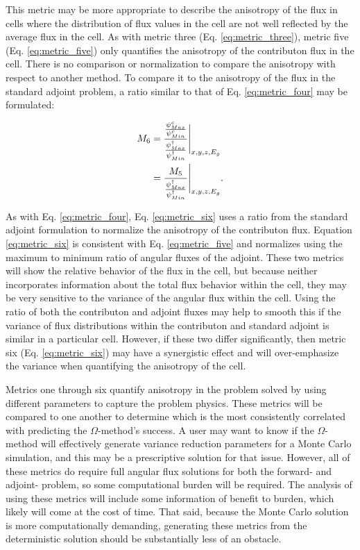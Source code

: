 This metric may be more appropriate to describe the anisotropy of the flux in
cells where the distribution of flux values in the cell are not well
reflected by the average flux in the cell. As with metric three (Eq.
\eqref{eq:metric_three}), metric five (Eq. \eqref{eq:metric_five}) only quantifies
the anisotropy of the contributon flux in the cell. There is no comparison or
normalization to compare the anisotropy with respect to another method. To
compare it to the anisotropy of the flux in the standard adjoint
problem, a ratio similar to that of Eq. \eqref{eq:metric_four} may be
formulated:

\begin{equation}
  \begin{split}
    M_{6} & =  \frac{\frac{\psi^{c}_{Max}}{\psi^{c}_{
                  Min}}}{\frac{\psi^{\dagger}_{
                  Max}}{\psi^{\dagger}_{Min}}} \Bigg\rvert_{x,y,z,E_g} \\
          & = \frac{M_{5}}{\frac{\psi^{\dagger}_{Max}}
                  {\psi^{\dagger}_{Min}}} \Bigg\rvert_{x,y,z,E_g}  .
  \end{split}
  \label{eq:metric_six}
\end{equation}

As with Eq. \eqref{eq:metric_four}, Eq. \eqref{eq:metric_six} uses a ratio from
the standard adjoint formulation to normalize the anisotropy of the
contributon flux. Equation \eqref{eq:metric_six} is consistent with Eq.
\eqref{eq:metric_five} and normalizes using the maximum to minimum
ratio of angular fluxes of the adjoint. These two
metrics will show the relative behavior of the flux in the cell, but because
neither incorporates information about the total flux behavior within the cell,
they may be very sensitive to the variance of the angular flux within the
cell. Using the ratio of both the contributon and adjoint fluxes may
help to smooth this if the variance of flux distributions within the contributon
and standard adjoint is similar in a particular cell. However, if these two
differ significantly, then metric six (Eq. \eqref{eq:metric_six}) may have a
synergistic effect
and will over-emphasize the variance when quantifying the anisotropy of the
cell.

Metrics one through six quantify anisotropy
in the problem solved by using different parameters to capture the problem
physics. These metrics will be compared to one another to determine which is the
most consistently correlated with predicting the $\Omega$-method's success. A
user may want to know if the $\Omega$-method will effectively generate variance
reduction parameters for a Monte Carlo simulation, and this may be a
prescriptive solution for that issue. However, all of these metrics do require
full angular flux solutions for both the forward- and adjoint- problem, so some
computational burden will be required.
The analysis of using these metrics will include some information of
benefit to burden, which likely will come at the cost of time.
That said, because the Monte Carlo solution is more computationally
demanding, generating these metrics from the deterministic solution should be
substantially less of an obstacle.

